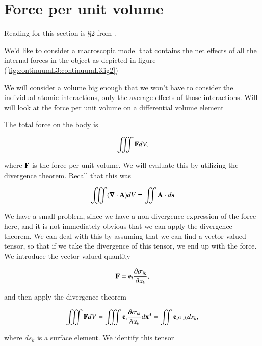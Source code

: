 \section{Force per unit volume}

Reading for this section is \S 2 from \citep{landau1960theory}.

We'd like to consider a macroscopic model that contains the net effects of all the internal forces in the object as depicted in figure (\ref{fig:continuumL3:continuumL3fig2})


We will consider a volume big enough that we won't have to consider the individual atomic interactions, only the average effects of those interactions.  Will will look at the force per unit volume on a differential volume element

The total force on the body is 

\begin{equation}\label{eqn:continuumL3:230}
\iiint \BF dV,
\end{equation}

where $\BF$ is the force per unit volume.  We will evaluate this by utilizing the divergence theorem.  Recall that this was

\begin{equation}\label{eqn:continuumL3:250}
\iiint (\spacegrad \cdot \BA) dV
= \iint \BA \cdot d\Bs
\end{equation}

We have a small problem, since we have a non-divergence expression of the force here, and it is not immediately obvious that we can apply the divergence theorem.  We can deal with this by assuming that we can find a vector valued tensor, so that if we take the divergence of this tensor, we end up with the force.  We introduce the vector valued quantity

\begin{equation}\label{eqn:continuumL3:270}
\BF = \Be_i \PD{x_k}{\sigma_{ik}},
\end{equation}

and then apply the divergence theorem

\begin{equation}\label{eqn:continuumL3:290}
\iiint \BF dV 
= \iiint \Be_i \PD{x_k}{\sigma_{ik}} d\Bx^3 
=
\iint \Be_i \sigma_{ik} ds_k,
\end{equation}

where $ds_k$ is a surface element.  We identify this tensor

